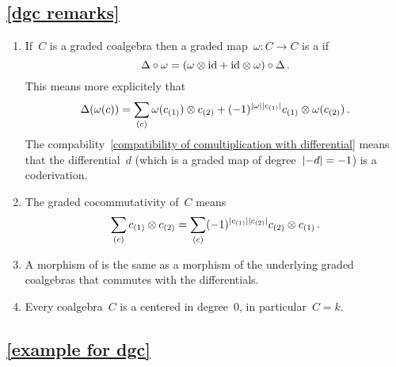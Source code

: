 




\subsection{\cref{dgc remarks}}
\label{dgc remarks proof}

\begin{enumerate}
  \item
    If~$C$ is a graded coalgebra then a graded map~$\omega \colon C \to C$ is a  if
    \[
      \Delta \circ \omega
      =
      (\omega \otimes {\operatorname{id}} + {\operatorname{id}} \otimes \omega) \circ \Delta \,.
    \]
    This means more explicitely that
    \[
      \Delta(\omega(c))
      =
      \sum_{(c)}
        \omega(c_{(1)}) \otimes c_{(2)}
      + (-1)^{\lvert\omega\rvert \lvert c_{(1)}\rvert} c_{(1)} \otimes \omega( c_{(2)} ) \,.
    \]
    The compability~\eqref{compatibility of comultiplication with differential} means that the differential~$d$ (which is a graded map of degree~$\lvert-d\rvert = -1$) is a coderivation.
  \item
    The graded cocommutativity of~$C$ means
    \[
      \sum_{(c)} c_{(1)} \otimes c_{(2)}
      =
      \sum_{(c)} (-1)^{\lvert c_{(1)}\rvert \lvert c_{(2)}\rvert} c_{(2)} \otimes c_{(1)} \,.
    \]
  \item
    A morphism of {\dgcs} is the same as a morphism of the underlying graded coalgebras that commutes with the differentials.
  \item
    Every coalgebra~$C$ is a {\dgc} centered in degree~$0$, in particular~$C = k$.
\end{enumerate}





\subsection{\cref{example for dgc}}
\label{example for dgc proof}

